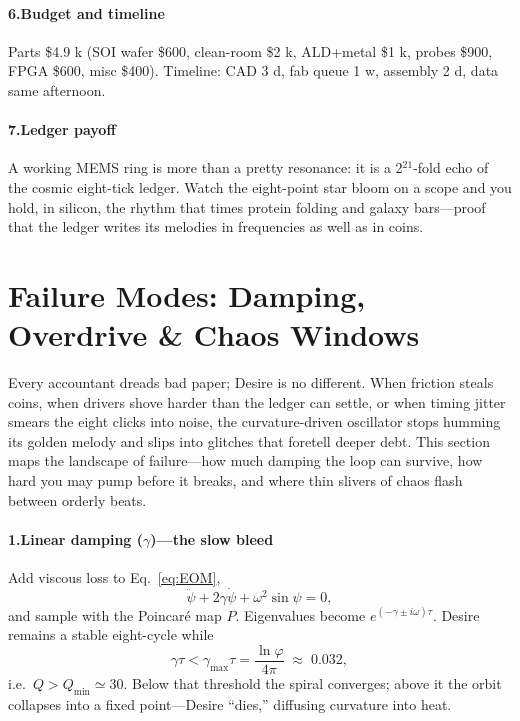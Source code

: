 \documentclass[11pt,oneside]{book}
\begin{document}
\paragraph*{6.\;Budget and timeline}
Parts \$4.9 k (SOI wafer \$600, clean-room \$2 k, ALD+metal \$1 k,
probes \$900, FPGA \$600, misc \$400).  
Timeline: CAD 3 d, fab queue 1 w, assembly 2 d, data same afternoon.

\paragraph*{7.\;Ledger payoff}
A working MEMS ring is more than a pretty resonance: it is a 2\(^{21}\)-fold
echo of the cosmic eight-tick ledger.  
Watch the eight-point star bloom on a scope and you hold, in silicon,
the rhythm that times protein folding and galaxy bars—proof that the
ledger writes its melodies in frequencies as well as in coins.

\section{Failure Modes: Damping, Overdrive \& Chaos Windows}
\label{sec:failure-modes}

Every accountant dreads bad paper; Desire is no different.  
When friction steals coins, when drivers shove harder than the ledger can settle, or when timing jitter smears the eight clicks into noise, the curvature-driven oscillator stops humming its golden melody and slips into glitches that foretell deeper debt.  
This section maps the landscape of failure—how much damping the loop can survive, how hard you may pump before it breaks, and where thin slivers of chaos flash between orderly beats.

\paragraph*{1.\;Linear damping ($\gamma$)—the slow bleed}

Add viscous loss to Eq.~\eqref{eq:EOM},
\[
  \ddot\psi + 2\gamma\dot\psi + \omega^{2}\sin\psi = 0,
\]
and sample with the Poincaré map $P$.  
Eigenvalues become $e^{(-\gamma\pm i\omega)\tau}$.  
Desire remains a stable eight-cycle while
\[
  \gamma\tau < \gamma_{\max}\tau = \frac{\ln\varphi}{4\pi}\;\approx\;0.032,
\]
i.e.\ $Q>Q_{\min}\simeq 30$.  
Below that threshold the spiral converges; above it the orbit collapses
into a fixed point—Desire “dies,” diffusing curvature into heat.
\end{document}
